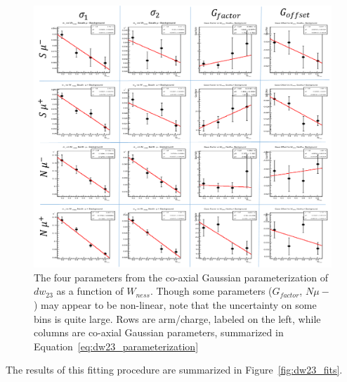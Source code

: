\begin{figure}
  \centering
  \includegraphics[width=\linewidth]{./figures/dw23_parameters_linearized.png}
  \caption{
    The four parameters from the co-axial Gaussian parameterization of $dw_{23}$
    as a function of $W_{ness}$. Though some parameters ($G_{factor}$, $N\mu-$)
    may appear to be non-linear, note that the uncertainty on some bins is quite
    large. Rows are arm/charge, labeled on the left, while columns are co-axial
    Gaussian parameters, summarized in Equation~\ref{eq:dw23_parameterization}
  }
  \label{fig:coax_params_vs_wness}
\end{figure}

The results of this fitting procedure are summarized in
Figure~\ref{fig:dw23_fits}.

